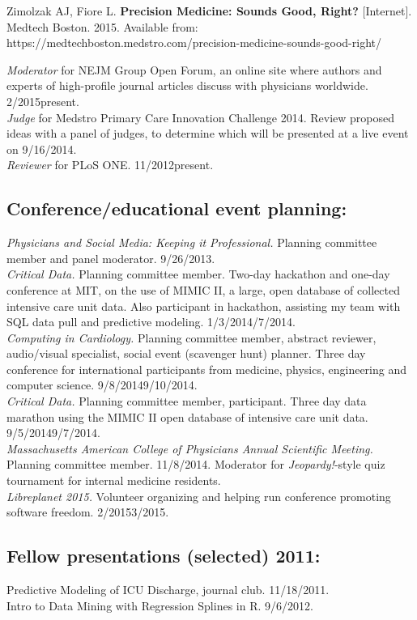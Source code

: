 \documentclass[12pt]{article}
\begin{document}
Zimolzak AJ, Fiore L. \textbf{Precision Medicine: Sounds Good, Right?}
[Internet]. Medtech Boston. 2015. Available from:
https://medtechboston.medstro.com/precision-medicine-sounds-good-right/

\emph{Moderator} for NEJM Group Open Forum, an online site where
authors and experts of high-profile journal articles discuss with
physicians worldwide. 2/2015\ndash{}present.\\
\emph{Judge} for Medstro Primary Care Innovation Challenge 2014.
Review proposed ideas with a panel of judges, to determine which will
be presented at a live event on 9/16/2014.\\
\emph{Reviewer} for PLoS ONE. 11/2012\ndash{}present.

\subsection*{Conference/educational event planning:} %
\emph{Physicians and Social Media: Keeping it Professional.} Planning
committee member and panel moderator. 9/26/2013.\\
\emph{Critical Data.} Planning committee member. Two-day hackathon and
one-day conference at MIT, on the use of MIMIC II, a large, open
database of collected intensive care unit data. Also participant in
hackathon, assisting my team with SQL data pull and predictive
modeling. 1/3/2014\ndash{}/7/2014.\\
\emph{Computing in Cardiology.} Planning committee member, abstract
reviewer, audio/visual specialist, social event (scavenger hunt)
planner. Three day conference for international participants from
medicine, physics, engineering and computer science.
9/8/2014\ndash{}9/10/2014.\\
\emph{Critical Data.} Planning committee member, participant. Three
day data marathon using the MIMIC II open database of intensive care
unit data. 9/5/2014\ndash{}9/7/2014.\\
\emph{Massachusetts American College of Physicians Annual Scientific
  Meeting.} Planning committee member. 11/8/2014. Moderator for
\emph{Jeopardy!}-style quiz tournament for internal medicine
residents.\\
\emph{Libreplanet 2015.} Volunteer organizing and helping run
conference promoting software freedom. 2/2015\ndash{}3/2015.

\subsection*{Fellow presentations (selected) 2011:}
Predictive Modeling of ICU Discharge, journal club. 11/18/2011.\\
Intro to Data Mining with Regression Splines in R. 9/6/2012.
\end{document}

